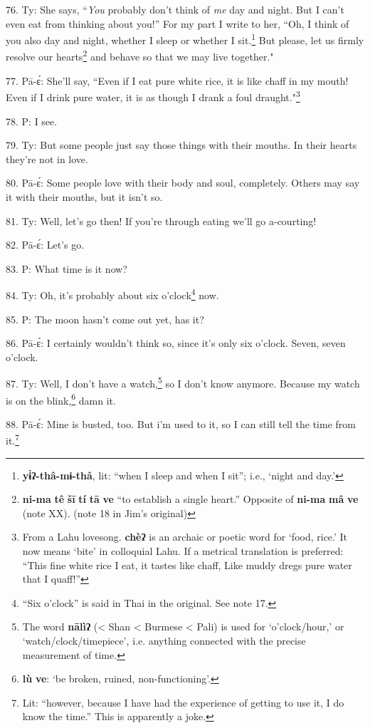 76. Ty: She says, ``\textit{You} probably don't think of \textit{me}
day and night. But I can't even eat from thinking about you!'' For my part
I write to her, ``Oh, I think of you also day and night, whether I sleep
or whether I sit.\footnote{\textbf{yɨ̀ʔ-thâ-mɨ-thâ}, lit: ``when I sleep and when I sit''; i.e., `night and day.'} But please, let us firmly resolve our hearts\footnote{\textbf{ni-ma} \textbf{tê} \textbf{šī} \textbf{tí} \textbf{tā} \textbf{ve} ``to establish a single heart.'' Opposite of \textbf{ni-ma} \textbf{mâ} \textbf{ve} (note XX). (note 18 in Jim's original)} and behave
so that we may live together."

77. Pā-ɛ́: She'll say, ``Even if I eat pure white rice, it is like chaff
in my mouth! Even if I drink pure water, it is as though I drank a foul draught."\footnote{From a Lahu lovesong. \textbf{chèʔ} is an archaic or poetic word for `food, rice.' It now means `bite' in colloquial Lahu. If a metrical translation is preferred: ``This fine white rice I eat, it tastes like chaff, Like muddy dregs pure water that I quaff!''}

78. P: I see.

79. Ty: But some people just say those things with their mouths. In their
hearts they're not in love.

80. Pā-ɛ́: Some people love with their body and soul, completely. Others may
say it with their mouths, but it isn't so.

81. Ty: Well, let's go then! If you're through eating we'll go a-courting!

82. Pā-ɛ́: Let's go.

83. P: What time is it now?

84. Ty: Oh, it's probably about six o'clock\footnote{``Six o'clock'' is said in Thai in the original. See note 17.} now.

85. P: The moon hasn't come out yet, has it?

86. Pā-ɛ́: I certainly wouldn't think so, since it's only six o'clock. Seven,
seven o'clock.

87. Ty: Well, I don't have a watch,\footnote{The word \textbf{nālìʔ} (< Shan < Burmese < Pali) is used for `o'clock/hour,' or `watch/clock/timepiece', i.e. anything connected with the precise measurement of time.} so I don't know anymore. Because my
watch is on the blink,\footnote{\textbf{lù} \textbf{ve}: `be broken, ruined, non-functioning'.} damn it.

88. Pā-ɛ́: Mine is busted, too. But i'm used to it, so I can still tell the
time from it.\footnote{Lit: ``however, because I have had the experience of getting to use it, I do know the time.'' This is apparently a joke.}

